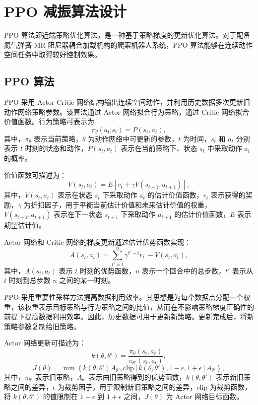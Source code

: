\documentclass[12pt,a4paper]{ctexart}
\begin{document}
\section{PPO 减振算法设计}
PPO 算法即近端策略优化算法，是一种基于策略梯度的更新优化算法。对于配备氮气弹簧-MR 阻尼器耦合加载机构的爬索机器人系统，PPO 算法能够在连续动作空间任务中取得较好控制效果。

\subsection{PPO 算法}
PPO 采用 Actor-Critic 网络结构输出连续空间动作，并利用历史数据多次更新旧动作网络策略参数。该算法通过 Actor 网络拟合行为策略，通过 Critic 网络拟合价值函数。行为策略可表示为
\begin{equation}
\pi_\theta(a_t|s_t)=P(s_t,a_t),
\end{equation}
其中，$\pi_\theta$ 表示当前策略，$\theta$ 为动作网络中可更新的参数，$t$ 为时间，$s_t$ 和 $a_t$ 分别表示 $t$ 时刻的状态和动作，$P(s_t,a_t)$ 表示在当前策略下、状态 $s_t$ 中采取动作 $a_t$ 的概率。

价值函数可描述为：
\begin{equation}
V(s_t,a_t)=E\left[r_t+\gamma V(s_{t+1},a_{t+1})\right],
\end{equation}
其中，$V(s_t,a_t)$ 表示在状态 $s_t$ 下采取动作 $a_t$ 的估计价值函数，$r_t$ 表示获得的奖励，$\gamma$ 为折扣因子，用于平衡当前估计价值和未来估计价值的权重，$V(s_{t+1},a_{t+1})$ 表示在下一状态 $s_{t+1}$ 下采取动作 $a_{t+1}$ 的估计价值函数，$E$ 表示期望估计值。

Actor 网络和 Critic 网络的梯度更新通过估计优势函数实现：
\begin{equation}
A(s_t,a_t)=\sum_{t'=t}^{n}\gamma^{t'-t}r_{t'}-V(s_t,a_t),
\end{equation}
其中，$A(s_t,a_t)$ 表示 $t$ 时刻的优势函数，$n$ 表示一个回合中的总步数，$t'$ 表示从 $t$ 时刻到总步数 $n$ 之间的某一时刻。

PPO 采用重要性采样方法提高数据利用效率。其思想是为每个数据点分配一个权重，该权重表示目标策略与行为策略之间的比值，从而在不影响策略梯度正确性的前提下提高数据利用效率。因此，历史数据可用于更新新策略。更新完成后，将新策略参数复制给旧策略。

Actor 网络更新可描述为：
\begin{equation}
k(\theta,\theta')=\frac{\pi_\theta(s_t,a_t)}{\pi_{\theta'}(s_t,a_t)},
\end{equation}
\begin{equation}
J(\theta)=\min\left\{
k(\theta,\theta')A_{\theta'},
\mathrm{clip}\left[k(\theta,\theta'),1-\epsilon,1+\epsilon\right]A_{\theta'}
\right\},
\end{equation}
其中，$\pi_{\theta'}$ 表示旧策略，$A_{\theta'}$ 表示由旧策略得到的优势函数，$k(\theta,\theta')$ 表示新旧策略之间的差异，$\epsilon$ 为裁剪因子，用于限制新旧策略之间的差异，$\mathrm{clip}$ 为裁剪函数，将 $k(\theta,\theta')$ 的值限制在 $1-\epsilon$ 到 $1+\epsilon$ 之间，$J(\theta)$ 为 Actor 网络目标函数。
\end{document}
